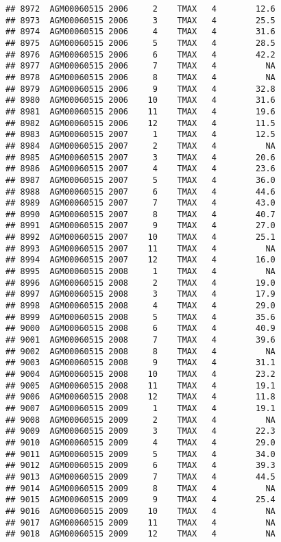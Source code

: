 \documentclass{article}\usepackage[]{graphicx}\usepackage[]{color}
\makeatletter
\newenvironment{kframe}{%
 \def\at@end@of@kframe{}%
 \ifinner\ifhmode%
  \def\at@end@of@kframe{\end{minipage}}%
  \begin{minipage}{\columnwidth}%
 \fi\fi%
 \def\FrameCommand##1{\hskip\@totalleftmargin \hskip-\fboxsep
 \colorbox{shadecolor}{##1}\hskip-\fboxsep
     \hskip-\linewidth \hskip-\@totalleftmargin \hskip\columnwidth}%
 \MakeFramed {\advance\hsize-\width
   \@totalleftmargin\z@ \linewidth\hsize
   \@setminipage}}%
 {\par\unskip\endMakeFramed%
 \at@end@of@kframe}
\newenvironment{knitrout}{}{} %
\makeatother
\begin{document}
\begin{knitrout}
\begin{kframe}
\begin{verbatim}
## 8972  AGM00060515 2006     2    TMAX   4        12.6
## 8973  AGM00060515 2006     3    TMAX   4        25.5
## 8974  AGM00060515 2006     4    TMAX   4        31.6
## 8975  AGM00060515 2006     5    TMAX   4        28.5
## 8976  AGM00060515 2006     6    TMAX   4        42.2
## 8977  AGM00060515 2006     7    TMAX   4          NA
## 8978  AGM00060515 2006     8    TMAX   4          NA
## 8979  AGM00060515 2006     9    TMAX   4        32.8
## 8980  AGM00060515 2006    10    TMAX   4        31.6
## 8981  AGM00060515 2006    11    TMAX   4        19.6
## 8982  AGM00060515 2006    12    TMAX   4        11.5
## 8983  AGM00060515 2007     1    TMAX   4        12.5
## 8984  AGM00060515 2007     2    TMAX   4          NA
## 8985  AGM00060515 2007     3    TMAX   4        20.6
## 8986  AGM00060515 2007     4    TMAX   4        23.6
## 8987  AGM00060515 2007     5    TMAX   4        36.0
## 8988  AGM00060515 2007     6    TMAX   4        44.6
## 8989  AGM00060515 2007     7    TMAX   4        43.0
## 8990  AGM00060515 2007     8    TMAX   4        40.7
## 8991  AGM00060515 2007     9    TMAX   4        27.0
## 8992  AGM00060515 2007    10    TMAX   4        25.1
## 8993  AGM00060515 2007    11    TMAX   4          NA
## 8994  AGM00060515 2007    12    TMAX   4        16.0
## 8995  AGM00060515 2008     1    TMAX   4          NA
## 8996  AGM00060515 2008     2    TMAX   4        19.0
## 8997  AGM00060515 2008     3    TMAX   4        17.9
## 8998  AGM00060515 2008     4    TMAX   4        29.0
## 8999  AGM00060515 2008     5    TMAX   4        35.6
## 9000  AGM00060515 2008     6    TMAX   4        40.9
## 9001  AGM00060515 2008     7    TMAX   4        39.6
## 9002  AGM00060515 2008     8    TMAX   4          NA
## 9003  AGM00060515 2008     9    TMAX   4        31.1
## 9004  AGM00060515 2008    10    TMAX   4        23.2
## 9005  AGM00060515 2008    11    TMAX   4        19.1
## 9006  AGM00060515 2008    12    TMAX   4        11.8
## 9007  AGM00060515 2009     1    TMAX   4        19.1
## 9008  AGM00060515 2009     2    TMAX   4          NA
## 9009  AGM00060515 2009     3    TMAX   4        22.3
## 9010  AGM00060515 2009     4    TMAX   4        29.0
## 9011  AGM00060515 2009     5    TMAX   4        34.0
## 9012  AGM00060515 2009     6    TMAX   4        39.3
## 9013  AGM00060515 2009     7    TMAX   4        44.5
## 9014  AGM00060515 2009     8    TMAX   4          NA
## 9015  AGM00060515 2009     9    TMAX   4        25.4
## 9016  AGM00060515 2009    10    TMAX   4          NA
## 9017  AGM00060515 2009    11    TMAX   4          NA
## 9018  AGM00060515 2009    12    TMAX   4          NA

\end{verbatim}
\end{kframe}
\end{knitrout}
\end{document}
